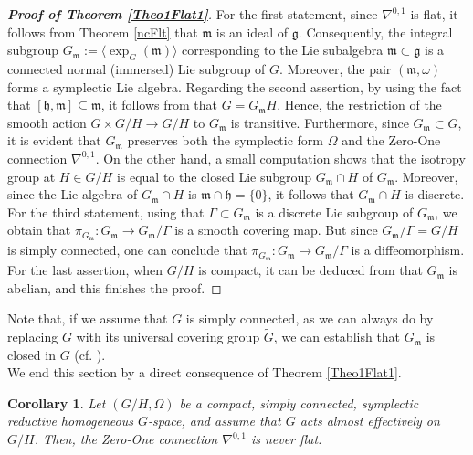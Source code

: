\documentclass[preprint,12pt,1p]{elsarticle}
\theoremstyle{plain}
\newtheorem{corollary}[theorem]{Corollary}
\theoremstyle{definition}
\newcommand{\n}{\nabla}
\newcommand{\nc}{\n^{0,1}}
\newcommand{\g}{\mathfrak{g}}
\newcommand{\h}{\mathfrak{h}}
\newcommand{\m}{\mathfrak{m}}
\numberwithin{equation}{section}
\begin{document}
\begin{proof}[\textnormal{\textbf{Proof of Theorem \ref{Theo1Flat1}}}] For the first statement, since $\nc$ is flat, it follows from Theorem \ref{ncFlt} that $\m$ is an ideal of $\g$. Consequently, the integral subgroup $G_\m:=\langle\exp_G(\m)\rangle$ corresponding to the Lie subalgebra $\m\subset\g$ is a connected normal (immersed) Lie subgroup of $G$. Moreover, the pair $(\mathfrak{m}, \omega)$ forms a symplectic Lie algebra. Regarding the second assertion, by using the fact that $[\h,\m]\subseteq\m$, it follows from \cite[p. $439$]{Nb} that $G=G_\m H$. Hence, the restriction of the smooth action $G\times G/H\to G/H$ to $G_\m$ is transitive. Furthermore, since $G_\m\subset G$, it is evident that $G_\m$ preserves both the symplectic form $\Omega$ and the Zero-One connection $\nc$. On the other hand, a small computation shows that the isotropy group at $H\in G/H$ is equal to the closed Lie subgroup $G_\m\cap H$ of $G_\m$. Moreover, since the Lie algebra of $G_\m\cap H$ is $\m\cap\h=\{0\}$, it follows that $G_\m\cap H$ is discrete. For the third statement, using that $\Gamma\subset G_\m$ is a discrete Lie subgroup of $G_\m$, we obtain that $\pi_{G_\m}:G_\m\to G_\m/\Gamma$ is a smooth covering map. But since $G_\m/\Gamma=G/H$ is simply connected, one can conclude that $\pi_{G_\m}:G_\m\to G_\m/\Gamma$ is a diffeomorphism. For the last assertion, when $G/H$ is compact, it can be deduced from \cite[p. $340$]{Hu} that $G_\mathfrak{m}$ is abelian, and this finishes the proof.
\end{proof}

Note that, if we assume that $G$ is simply connected, as we can always do by replacing $G$ with its universal covering group $\widetilde{G}$, we can establish that $G_\m$ is closed in $G$ (cf. \cite[p. $440$]{Nb}).\\

We end this section by a direct consequence of Theorem \ref{Theo1Flat1}.
\begin{corollary}
Let $(G/H,\Omega)$ be a compact, simply connected, symplectic reductive homogeneous $G$-space, and assume that $G$ acts almost effectively on $G/H$. Then, the Zero-One connection $\nc$ is never flat.
\end{corollary}
\end{document}
